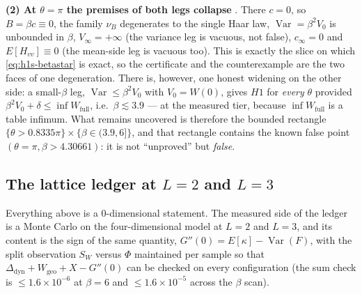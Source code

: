 \textbf{(2) At $\theta=\pi$ the premises of both legs collapse} \LM. There $c=0$, so $B=\beta c\equiv0$,
the family $\nu_{B}$ degenerates to the single Haar law, $\operatorname{Var}=\beta^{2}V_{0}$ is
unbounded in $\beta$, $V_{\infty}=+\infty$ (the variance leg is vacuous, not false), $c_{\infty}=0$ and
$E[H_{vv}]\equiv0$ (the mean-side leg is vacuous too). This is exactly the slice on which
\eqref{eq:h1s-betastar} is exact, so the certificate and the counterexample are the two faces of one
degeneration. There is, however, one honest widening on the other side: a small-$\beta$ leg,
$\operatorname{Var}\le\beta^{2}V_{0}$ with $V_{0}=W(0)$, gives $H1$ for \emph{every} $\theta$ provided
$\beta^{2}V_{0}+\delta\le\inf W_{\mathrm{full}}$, i.e.\ $\beta\lesssim3.9$ --- at the measured tier,
because $\inf W_{\mathrm{full}}$ is a table infimum. What remains uncovered is therefore the bounded
rectangle $\{\theta>0.8335\pi\}\times\{\beta\in(3.9,6]\}$, and that rectangle contains the known false
point $(\theta=\pi,\beta>4.30661)$: it is not ``unproved'' but \emph{false}.


\subsection{The lattice ledger at $L=2$ and $L=3$}
\label{sec:h1s-lattice}

Everything above is a $0$-dimensional statement. The measured side of the ledger is a Monte Carlo on
the four-dimensional model at $L=2$ and $L=3$, and its content is the sign of the same quantity,
$G''(0)=E[\kappa]-\operatorname{Var}(F)$, with the split observation $S_W$ versus $\Phi$ maintained per
sample so that $\Delta_{\mathrm{dyn}}+W_{\mathrm{geo}}+X-G''(0)$ can be checked on every configuration
(the sum check is $\le1.6\times10^{-6}$ at $\beta=6$ and $\le1.6\times10^{-5}$ across the $\beta$
scan).

